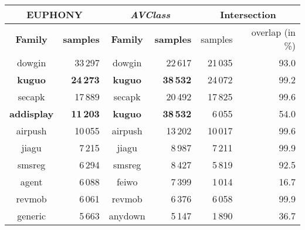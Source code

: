\begin{tabular}{|cr|cr|rr|}
    \hline
    \multicolumn{2}{|c|}{\textbf{EUPHONY}} & \multicolumn{2}{c|}{\textbf{{\em AVClass}}} & \multicolumn{2}{c|}{Intersection} \\
    \hline
    \textbf{Family}    & \textbf{samples} & \textbf{Family}  & \textbf{samples} & samples & overlap (in \%) \\
    \hline
    dowgin    & 33\,297   & dowgin  & 22\,617   & 21\,035   & 93.0 \\
    \textbf{kuguo}     & \textbf{24\,273}   & \textbf{kuguo}   & \textbf{38\,532}   & 24\,072   & 99.2 \\
    secapk    & 17\,889   & secapk  & 20\,492   & 17\,825   & 99.6 \\
    \textbf{addisplay} & \textbf{11\,203}   & \textbf{kuguo}   & \textbf{38\,532}   & 6\,055    & 54.0 \\
    airpush   & 10\,055   & airpush & 13\,202   & 10\,017   & 99.6 \\
    jiagu     & 7\,215    & jiagu   & 8\,987    & 7\,211    & 99.9 \\
    smsreg    & 6\,294    & smsreg  & 8\,427    & 5\,819    & 92.5 \\
    agent     & 6\,088    & feiwo   & 7\,399    & 1\,014    & 16.7 \\
    revmob    & 6\,061    & revmob  & 6\,376    & 6\,058    & 99.9 \\
    generic   & 5\,663    & anydown & 5\,147    & 1\,890    & 36.7 \\
    \hline
\end{tabular}
